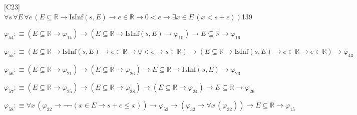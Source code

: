 \begin{fullproof}{[C23]}{$\forall s\,\forall E\,\forall e\,(E \subseteq \mathbb{R} \to \mathrm{IsInf}(s,E) \to e \in \mathbb{R} \to 0 < e \to \exists x \in E\,(x < s + e))$}{139}
\begin{abbrevlist}
\item $\varphi_{54} :\equiv (E \subseteq \mathbb{R} \to \varphi_{14}) \to (E \subseteq \mathbb{R} \to \mathrm{IsInf}(s,E) \to \varphi_{10}) \to E \subseteq \mathbb{R} \to \varphi_{16}$
\item $\varphi_{55} :\equiv (E \subseteq \mathbb{R} \to \mathrm{IsInf}(s,E) \to e \in \mathbb{R} \to 0 < e \to s \in \mathbb{R}) \to (E \subseteq \mathbb{R} \to \mathrm{IsInf}(s,E) \to e \in \mathbb{R} \to e \in \mathbb{R}) \to \varphi_{43}$
\item $\varphi_{56} :\equiv (E \subseteq \mathbb{R} \to \varphi_{21}) \to (E \subseteq \mathbb{R} \to \varphi_{26}) \to E \subseteq \mathbb{R} \to \mathrm{IsInf}(s,E) \to \varphi_{23}$
\item $\varphi_{57} :\equiv (E \subseteq \mathbb{R} \to \varphi_{25}) \to (E \subseteq \mathbb{R} \to \varphi_{28}) \to (E \subseteq \mathbb{R} \to \varphi_{24}) \to E \subseteq \mathbb{R} \to \varphi_{26}$
\item $\varphi_{58} :\equiv \forall x\,(\varphi_{32} \to \neg \neg (x \in E \to s + e \leq x)) \to \varphi_{52} \to (\varphi_{32} \to \forall x\,(\varphi_{32})) \to E \subseteq \mathbb{R} \to \varphi_{15}$
\end{abbrevlist}
\end{fullproof}
